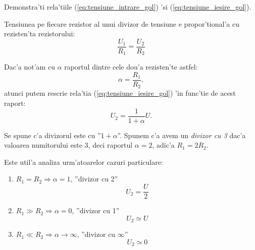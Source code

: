 \begin{exercise}
Demonstra'ti rela'tiile (\ref{eq:tensiune_intrare_gol}) 'si (\ref{eq:tensiune_iesire_gol}).
\end{exercise}

\begin{retine}
  \label{retine1}
  \index{}
	Tensiunea pe fiecare rezistor al unui divizor de tensiune e propor'tional'a cu rezisten'ta rezistorului:
  \small
  \begin{equation*}
    \frac{U_1}{R_1} = \frac{U_2}{R_2}
  \end{equation*}
\end{retine}

Dac'a not'am cu $\alpha$ raportul dintre cele dou'a rezisten'te astfel:
\begin{equation}
\alpha = \frac{R_1}{R_2},
\end{equation}
atunci putem rescrie rela'tia (\ref{eq:tensiune_iesire_gol}) 'in func'tie de acest raport:
\begin{equation}
U_2 = \frac{1}{1+\alpha}U.
\end{equation}

Se spune c'a divizorul este cu ''$1+\alpha$''. Spunem c'a avem un \textit{divizor cu 3} dac'a valoarea numitorului este 3, deci raportul $\alpha = 2$, adic'a $R_1=2R_2$.

\begin{retine}
  \label{retine2}
  \index{}
	Este util'a analiza urm'atoarelor cazuri particulare:
\begin{enumerate}
\item $R_1 = R_2 \Rightarrow \alpha = 1$, ''divizor cu 2''
\begin{equation*}
U_2 = \frac{U}{2}
\end{equation*}
\item $R_1 \gg R_2 \Rightarrow \alpha = 0$, ''divizor cu 1''
\begin{equation*}
U_2 \simeq U
\end{equation*}
\item $R_1 \ll R_2 \Rightarrow \alpha\rightarrow\infty$, ''divizor cu $\infty$''
\begin{equation*}
U_2 \simeq 0
\end{equation*}
\end{enumerate}
\end{retine}


